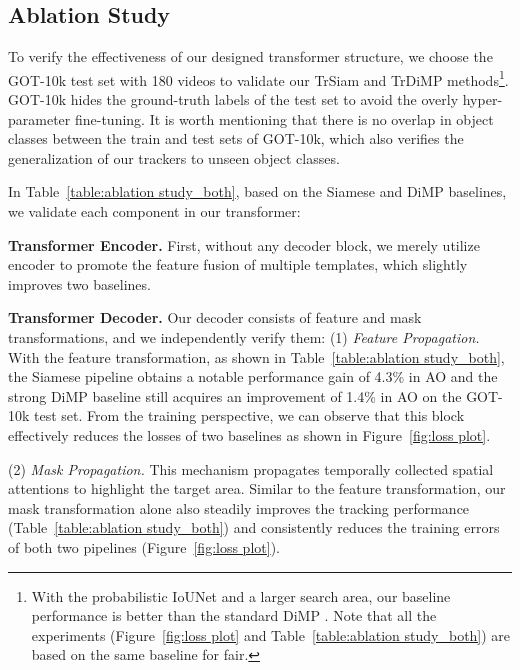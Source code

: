 \documentclass[10pt,twocolumn,letterpaper]{article}
\begin{document}
\subsection{Ablation Study}
To verify the effectiveness of our designed transformer structure, we choose the GOT-10k test set \cite{GOT10k} with 180 videos to validate our TrSiam and TrDiMP methods\footnote{With the probabilistic IoUNet \cite{PrDiMP} and a larger search area, our baseline performance is better than the standard DiMP \cite{DiMP}. Note that all the experiments (Figure~\ref{fig:loss plot} and Table~\ref{table:ablation study_both}) are based on the same baseline for fair.}.
GOT-10k hides the ground-truth labels of the test set to avoid the overly hyper-parameter fine-tuning.
It is worth mentioning that there is no overlap in object classes between the train and test sets of GOT-10k, which also verifies the generalization of our trackers to unseen object classes.




In Table~\ref{table:ablation study_both}, based on the Siamese and DiMP baselines, we validate each component in our transformer:



{\noindent \bf Transformer Encoder.} First, without any decoder block, we merely utilize encoder to promote the feature fusion of multiple templates, which slightly improves two baselines.


{\noindent \bf Transformer Decoder.}
Our decoder consists of feature and mask transformations, and we independently verify them:
{\noindent (1)} \emph{Feature Propagation.} 
With the feature transformation, as shown in Table~\ref{table:ablation study_both}, the Siamese pipeline obtains a notable performance gain of 4.3\% in AO and the strong DiMP baseline still acquires an improvement of 1.4\% in AO on the GOT-10k test set.
From the training perspective, we can observe that this block effectively reduces the losses of two baselines as shown in Figure~\ref{fig:loss plot}.



{\noindent (2)} \emph{Mask Propagation.} This mechanism propagates temporally collected spatial attentions to highlight the target area.
Similar to the feature transformation, our mask transformation alone also steadily improves the tracking performance (Table~\ref{table:ablation study_both}) and consistently reduces the training errors of both two pipelines (Figure~\ref{fig:loss plot}). 
\end{document}
